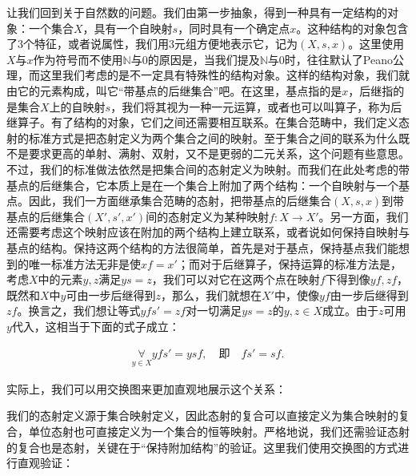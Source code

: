 \documentclass[oneside, 12pt]{ctexart}
\begin{document}
让我们回到关于自然数的问题。我们由第一步抽象，得到一种具有一定结构的对象：一个集合$X$，具有一个自映射$s$，同时具有一个确定点$x$。这种结构的对象包含了$3$个特征，或者说属性，我们用$3$元组方便地表示它，记为$(X, s, x)$。这里使用$X$与$x$作为符号而不使用$\mathbb{N}$与$0$的原因是，当我们提及$\mathbb{N}$与$0$时，往往默认了Peano公理，而这里我们考虑的是不一定具有特殊性的结构对象。这样的结构对象，我们就由它的元素构成，叫它“带基点的后继集合”吧。在这里，基点指的是$x$，后继指的是集合$X$上的自映射$s$，我们将其视为一种一元运算，或者也可以叫算子，称为后继算子。有了结构的对象，它们之间还需要相互联系。在集合范畴中，我们定义态射的标准方式是把态射定义为两个集合之间的映射。至于集合之间的联系为什么既不是要求更高的单射、满射、双射，又不是更弱的二元关系，这个问题有些意思。不过，我们的标准做法依然是把集合间的态射定义为映射。而我们在此处考虑的带基点的后继集合，它本质上是在一个集合上附加了两个结构：一个自映射与一个基点。因此，我们一方面继承集合范畴的态射，把带基点的后继集合$(X, s, x)$到带基点的后继集合$(X', s', x')$间的态射定义为某种映射$f \colon X \to X'$。另一方面，我们还需要考虑这个映射应该在附加的两个结构上建立联系，或者说如何保持自映射与基点的结构。保持这两个结构的方法很简单，首先是对于基点，保持基点我们能想到的唯一标准方法无非是使$xf = x'$；而对于后继算子，保持运算的标准方法是，考虑$X$中的元素$y, z$满足$ys = z$，我们可以对它在这两个点在映射$f$下得到像$yf, zf$，既然和$X$中$y$可由一步后继得到$z$，那么，我们就想在$X'$中，使像$yf$由一步后继得到$zf$。换言之，我们想让等式$yfs' = zf$对一切满足$ys = z$的$y,z \in X$成立。由于$z$可用$y$代入，这相当于下面的式子成立：

\begin{gather*}
	\mathop{\forall}\limits_{y \in X} yfs' = ysf, \quad \text{即} \quad fs' = sf.
\end{gather*}

实际上，我们可以用交换图来更加直观地展示这个关系：

\begin{center}
\end{center}

我们的态射定义源于集合映射定义，因此态射的复合可以直接定义为集合映射的复合，单位态射也可直接定义为一个集合的恒等映射。严格地说，我们还需验证态射的复合也是态射，关键在于“保持附加结构”的验证。这里我们使用交换图的方式进行直观验证：

\begin{center}
\end{center}
\end{document}
